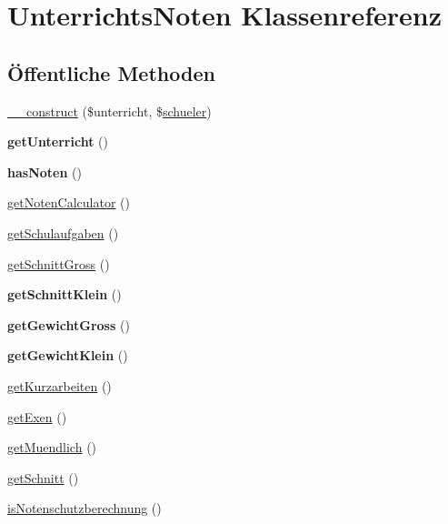 \hypertarget{class_unterrichts_noten}{}\section{Unterrichts\+Noten Klassenreferenz}
\label{class_unterrichts_noten}
\subsection*{Öffentliche Methoden}
\begin{DoxyCompactItemize}
\item 
\mbox{\hyperlink{class_unterrichts_noten_ae76f0d5c378eed886a6e9c82f308f75f}{\+\_\+\+\_\+construct}} (\$unterricht, \$\mbox{\hyperlink{classschueler}{schueler}})
\item 
\mbox{\label{class_unterrichts_noten_a0cbd61181181dcfb35256869e1c565d2}} 
{\bfseries get\+Unterricht} ()
\item 
\mbox{\label{class_unterrichts_noten_a34507132874f2f0eef846fa0d2eeb52e}} 
{\bfseries has\+Noten} ()
\item 
\mbox{\hyperlink{class_unterrichts_noten_a8f0d6226b8bcf6bd9ac5b15a9eb8b87f}{get\+Noten\+Calculator}} ()
\item 
\mbox{\hyperlink{class_unterrichts_noten_a949fb5e1e7c703429133c2e0566a8919}{get\+Schulaufgaben}} ()
\item 
\mbox{\hyperlink{class_unterrichts_noten_acc388f21e1d9451766801a09a75faf96}{get\+Schnitt\+Gross}} ()
\item 
\mbox{\label{class_unterrichts_noten_a219e4aa0c3d39cfd82138d907859180c}} 
{\bfseries get\+Schnitt\+Klein} ()
\item 
\mbox{\label{class_unterrichts_noten_afb5e43a0ff877c7973cf9ae9629b7d78}} 
{\bfseries get\+Gewicht\+Gross} ()
\item 
\mbox{\label{class_unterrichts_noten_a4a2530ee8b29c2eab099160d7c4c18a7}} 
{\bfseries get\+Gewicht\+Klein} ()
\item 
\mbox{\hyperlink{class_unterrichts_noten_a1f28c0082644b98f77b9b38d38f40f23}{get\+Kurzarbeiten}} ()
\item 
\mbox{\hyperlink{class_unterrichts_noten_a5e1d25f56dedb89f485365e1c63ce5c3}{get\+Exen}} ()
\item 
\mbox{\hyperlink{class_unterrichts_noten_a8c1a0c85b7ef4da077ca3cd9b9b098d0}{get\+Muendlich}} ()
\item 
\mbox{\hyperlink{class_unterrichts_noten_ab821ecae7151fb0d918924e1a6ba606f}{get\+Schnitt}} ()
\item 
\mbox{\hyperlink{class_unterrichts_noten_a56014dfb5aa657a7bff3f617f03a9884}{is\+Notenschutzberechnung}} ()
\end{DoxyCompactItemize}


